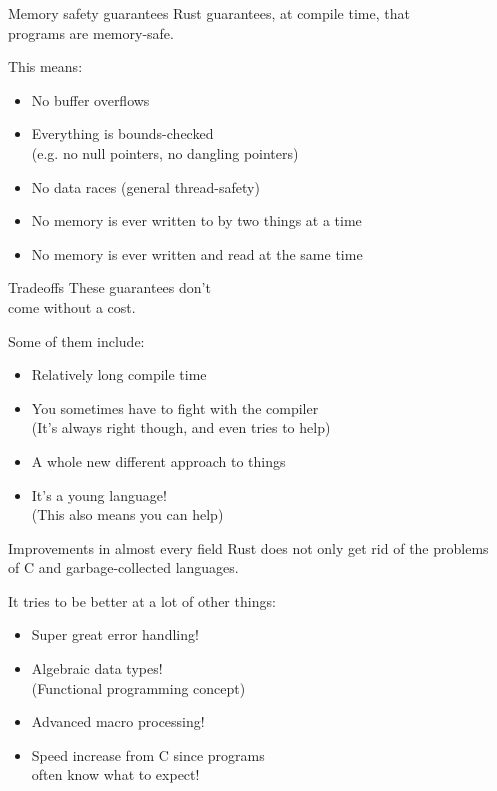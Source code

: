 \documentclass[usenames,dvipsnames,10pt,aspectratio=169]{beamer}
\begin{document}
\begin{frame}{Memory safety guarantees}
\large
Rust guarantees, at compile time, that\\
programs are memory-safe.\\

\vspace{0.3cm}

This means:
\begin{itemize}[label=$\bullet$]
	\item No buffer overflows
	\item Everything is bounds-checked\\ (e.g. no null pointers, no dangling pointers)
	\item No data races (general thread-safety)
	\item No memory is ever written to by two things at a time
	\item No memory is ever written and read at the same time
\end{itemize}
\end{frame}

\begin{frame}{Tradeoffs}
\large
These guarantees don't\\
come without a cost.

\vspace{0.3cm}

Some of them include:
\begin{itemize}[label=$\bullet$]
	\item Relatively long compile time
	\item You sometimes have to fight with the compiler\\
		(It's always right though, and even tries to help)
	\item A whole new different approach to things
	\item It's a young language!\\
		(This also means you can help)
\end{itemize}
\end{frame}

\begin{frame}{Improvements in almost every field} 
	\large
Rust does not only get rid of the problems\\
of C and garbage-collected languages.
\vspace{0.3cm}

It tries to be better at a lot of other things:
\begin{itemize}[label=$\bullet$]
	\item Super great error handling!
	\item Algebraic data types!\\
		(Functional programming concept)
	\item Advanced macro processing!
	\item Speed increase from C since programs \\
		often know what to expect!
\end{itemize}
\end{frame}
\end{document}
